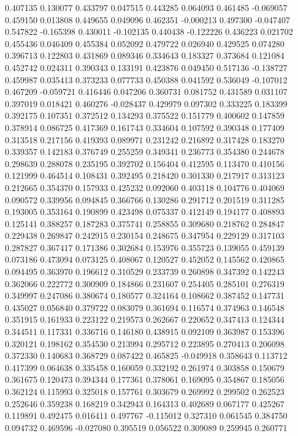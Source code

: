 0.407135
0.130077
0.433797
0.047515
0.443285
0.064093
0.461485
-0.069057
0.459150
0.013808
0.449655
0.049096
0.462351
-0.000213
0.497300
-0.047407
0.547822
-0.165398
0.430011
-0.102135
0.440438
-0.122226
0.436223
0.021702
0.455436
0.046409
0.455384
0.052092
0.479722
0.026940
0.429525
0.074280
0.396713
0.122803
0.431869
0.089346
0.334643
0.183327
0.373684
0.121084
0.452742
0.024311
0.390343
0.133191
0.423876
0.049450
0.517136
-0.138727
0.459987
0.035413
0.373233
0.077733
0.450388
0.041592
0.536049
-0.107012
0.467209
-0.059721
0.416446
0.047206
0.360731
0.081752
0.431589
0.031107
0.397019
0.018421
0.460276
-0.028437
0.429979
0.097302
0.333225
0.183399
0.392175
0.107351
0.372512
0.134293
0.375522
0.151779
0.400602
0.147859
0.378914
0.086725
0.417369
0.161743
0.334604
0.107592
0.390348
0.177409
0.313518
0.217156
0.419393
0.089971
0.231242
0.216892
0.317428
0.183270
0.339357
0.142183
0.376749
0.255259
0.349341
0.236773
0.354380
0.244678
0.298639
0.288078
0.235195
0.392702
0.156404
0.412595
0.113470
0.410156
0.121999
0.464514
0.108431
0.392495
0.218420
0.301330
0.217917
0.313123
0.212665
0.354370
0.157933
0.425232
0.092060
0.403118
0.104776
0.404069
0.090572
0.339956
0.094845
0.366766
0.130286
0.291712
0.201519
0.311285
0.193005
0.353164
0.190899
0.423498
0.075337
0.412149
0.194177
0.408893
0.125141
0.388257
0.187283
0.375741
0.258855
0.309680
0.218762
0.284847
0.229438
0.269847
0.242915
0.230154
0.248675
0.347954
0.229129
0.317103
0.287827
0.367417
0.171386
0.302684
0.153976
0.355723
0.139055
0.459139
0.073186
0.473094
0.073125
0.408067
0.120527
0.452052
0.145562
0.420865
0.094495
0.363970
0.196612
0.310529
0.233739
0.260898
0.347392
0.142243
0.362066
0.222772
0.300909
0.184866
0.231607
0.254405
0.285101
0.276319
0.349997
0.247086
0.380674
0.180577
0.324164
0.108662
0.387452
0.147731
0.435027
0.056840
0.379722
0.083079
0.361694
0.116574
0.374963
0.146548
0.351915
0.161933
0.223122
0.219573
0.262667
0.220652
0.347413
0.124344
0.344511
0.117331
0.336716
0.146180
0.438915
0.092109
0.363987
0.153396
0.320121
0.198162
0.354530
0.213994
0.295712
0.223895
0.270413
0.206098
0.372330
0.140683
0.368729
0.087422
0.465825
-0.049918
0.358643
0.113712
0.417399
0.064638
0.335458
0.160059
0.332192
0.261974
0.303858
0.150679
0.361675
0.120473
0.394344
0.177361
0.378061
0.169095
0.354867
0.185056
0.362124
0.115993
0.325018
0.157761
0.303679
0.269992
0.299502
0.262523
0.252646
0.359238
0.168219
0.342943
0.164313
0.402689
0.067177
0.425267
0.119891
0.492475
0.016411
0.497767
-0.115012
0.327310
0.061545
0.384750
0.094732
0.469596
-0.027080
0.395519
0.056522
0.309089
0.259945
0.260771
